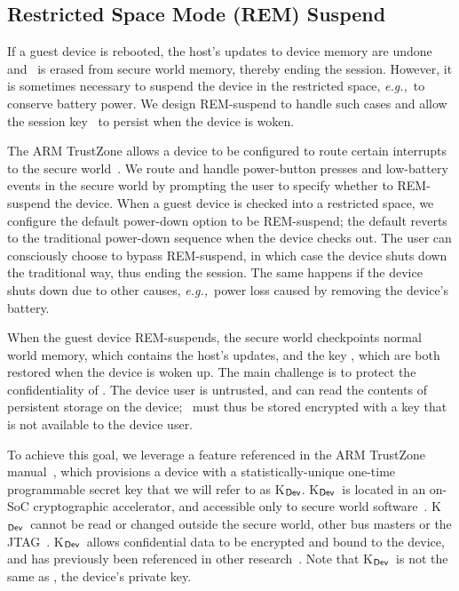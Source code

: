 \documentclass[pageno]{sig-alternate-05-2015}
\newcommand{\eg}{\textit{e.g.,}}
\begin{document}
\subsection{Restricted Space Mode (REM) Suspend}
\label{section:mechanism:REMsuspend}

\newcommand{\kdev}{{\sf K$_{\sf Dev}$}}
%
If a guest device is rebooted, the host's updates to device memory are undone
and \ks\ is erased from secure world memory, thereby ending the session.
However, it is sometimes necessary to suspend the device in the restricted
space, \eg~to conserve battery power. We design REM-suspend to handle such
cases and allow the session key \ks\ to persist when the device is woken.

The ARM TrustZone allows a device to be configured to route certain interrupts
to the secure world~\cite{armtz}. We route and handle power-button presses and
low-battery events in the secure world by prompting the user to specify whether
to REM-suspend the device. When a guest device is checked into a restricted
space, we configure the default power-down option to be REM-suspend; the
default reverts to the traditional power-down sequence when the device checks
out. The user can consciously choose to bypass REM-suspend, in which case the
device shuts down the traditional way, thus ending the session. The same
happens if the device shuts down due to other causes, \eg~power loss caused by
removing the device's battery. 

When the guest device REM-suspends, the secure world checkpoints normal world
memory, which contains the host's updates, and the key \ks, which are both
restored when the device is woken up. The main challenge is to protect the
confidentiality of \ks. The device user is untrusted, and can read the contents
of persistent storage on the device; \ks\ must thus be stored encrypted with a
key that is not available to the device user.

To achieve this goal, we leverage a feature referenced in the ARM TrustZone
manual~\cite[\S6.3.1]{armtz}, which provisions a device with a
statistically-unique one-time programmable secret key that we will refer to as
\kdev. \kdev\ is located in an on-SoC cryptographic accelerator, and accessible
only to secure world software~\cite[\S6.3.1]{armtz}. \kdev\ cannot be read or
changed outside the secure world, other bus masters or the JTAG~\cite{jtag}.
\kdev\ allows confidential data to be encrypted and bound to the device, and
has previously been referenced in other
research~\cite{tlr:asplos14,sentry:asplos15,ftpm:msrtr,mobiletrustedcomputing:ieee14}.
Note that \kdev\ is not the same as , the device's private key.
\end{document}
